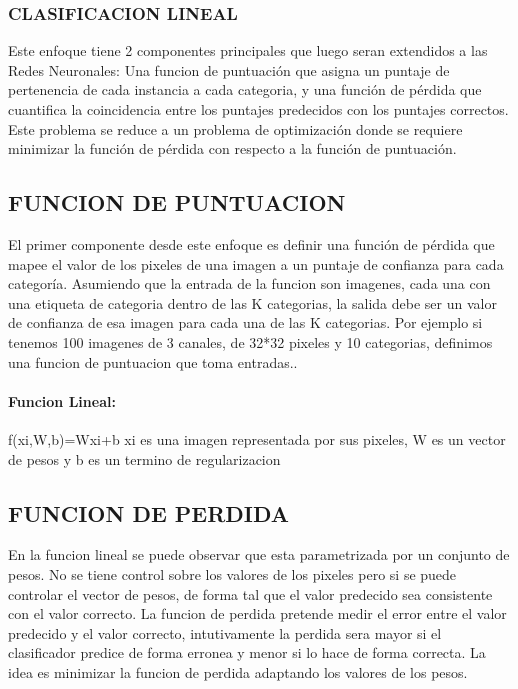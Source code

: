 \documentclass[a4paper,12pt,spanish]{book}
\begin{document}
      \subsubsection{CLASIFICACION LINEAL}
	Este enfoque tiene 2 componentes principales que luego seran extendidos a las Redes Neuronales: Una funcion de puntuación que asigna un puntaje de pertenencia de cada instancia a cada categoria, 
	y una función de pérdida que cuantifica la coincidencia entre los puntajes predecidos con los puntajes correctos.
	Este problema se reduce a un problema de optimización donde se requiere minimizar la función de pérdida con respecto a la función de puntuación.

    \subsection{FUNCION DE PUNTUACION}
      El primer componente desde este enfoque es definir una función de pérdida que mapee el valor de los pixeles de una imagen a un puntaje de confianza para cada categoría.
      Asumiendo que la entrada de la funcion son imagenes, cada una con una etiqueta de categoria dentro de las K categorias, la salida debe ser un valor de confianza de esa imagen 
      para cada una de las K categorias.
    Por ejemplo si tenemos 100 imagenes de 3 canales, de 32*32 pixeles y 10 categorias, definimos una funcion de puntuacion que toma entradas..

      \paragraph{Funcion Lineal:} 
	f(xi,W,b)=Wxi+b
	xi es una imagen representada por sus pixeles, W es un vector de pesos y b es un termino de regularizacion

    \subsection{FUNCION DE PERDIDA}
      En la funcion lineal se puede observar que esta parametrizada por un conjunto de pesos.
      No se tiene control sobre los valores de los pixeles pero si se puede controlar el vector de pesos, de forma tal que el valor predecido sea consistente con el valor correcto. 
      La funcion de perdida pretende medir el error entre el valor predecido y el valor correcto, intutivamente la perdida sera mayor si el clasificador predice de forma erronea y 
      menor si lo hace de forma correcta.
      La idea es minimizar la funcion de perdida adaptando los valores de los pesos.
\end{document}
